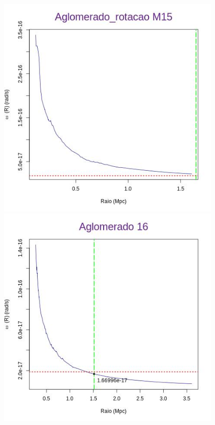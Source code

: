 \begin{apendicesenv}
\begin{figure}[H]
\begin{center}
\includegraphics[scale=.3]{04-figuras/selec20/perfil15}
\includegraphics[scale=.3]{04-figuras/selec20/perfil16}\hfill

\end{center}
\end{figure}
\end{apendicesenv}
